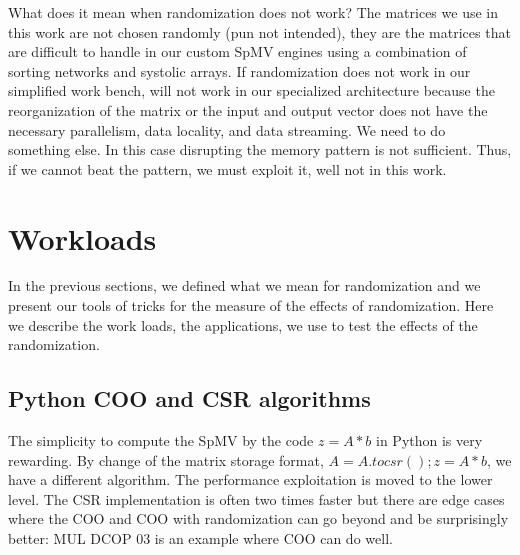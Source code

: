 \documentclass[manuscript,screen]{acmart}
\begin{document}



What does it mean when randomization does not work? The matrices we
use in this work are not chosen randomly (pun not intended), they are
the matrices that are difficult to handle in our custom SpMV engines
using a combination of sorting networks and systolic arrays. If
randomization does not work in our simplified work bench, will not
work in our specialized architecture because the reorganization of the
matrix or the input and output vector does not have the necessary
parallelism, data locality, and data streaming. We need to do
something else. In this case disrupting the memory pattern is not
sufficient. Thus, if we cannot beat the pattern, we must exploit it,
well not in this work.

\section{Workloads}
\label{sec:workload}

In the previous sections, we defined what we mean for randomization
and we present our tools of tricks for the measure of the effects of
randomization. Here we describe the work loads, the applications, we
use to test the effects of the randomization.

\subsection{Python COO and CSR algorithms}
\label{sec:pythoncoocsr}
The simplicity to compute the SpMV by the code $z = A*b$ in Python is
very rewarding. By change of the matrix storage format, $A =
A.tocsr(); z = A*b$, we have a different algorithm. The performance
exploitation is moved to the lower level.  The CSR implementation is
often two times faster but there are edge cases where the COO and COO
with randomization can go beyond and be surprisingly better: MUL DCOP
03 is an example where COO can do well.
\end{document}
